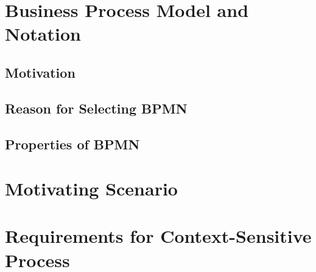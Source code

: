 \chapter{Business Process Model and Notation} \label{chap:bpmn}
\section{Motivation}
\section{Reason for Selecting BPMN}
\section{Properties of BPMN}
\chapter{Motivating Scenario} \label{chap:motscene}
\chapter{Requirements for Context-Sensitive Process} \label{chap:requirements}